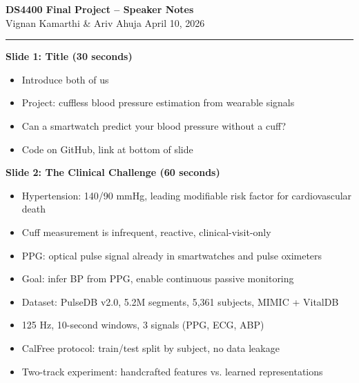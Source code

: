 \documentclass[11pt]{article}
\begin{document}
{\Large\bfseries DS4400 Final Project -- Speaker Notes}\\[2pt]
{\normalsize Vignan Kamarthi \& Ariv Ahuja \textbar{} April 10, 2026}
\vspace{4pt}
\hrule
\vspace{6pt}

\textbf{Slide 1: Title (30 seconds)}
\begin{itemize}
  \item [ARIV] Introduce both of us
  \item [ARIV] Project: cuffless blood pressure estimation from wearable signals
  \item [ARIV] Can a smartwatch predict your blood pressure without a cuff?
  \item [ARIV] Code on GitHub, link at bottom of slide
\end{itemize}

\textbf{Slide 2: The Clinical Challenge (60 seconds)}
\begin{itemize}
  \item [ARIV] Hypertension: 140/90 mmHg, leading modifiable risk factor for cardiovascular death
  \item [ARIV] Cuff measurement is infrequent, reactive, clinical-visit-only
  \item [ARIV] PPG: optical pulse signal already in smartwatches and pulse oximeters
  \item [ARIV] Goal: infer BP from PPG, enable continuous passive monitoring
  \item [ARIV] Dataset: PulseDB v2.0, 5.2M segments, 5,361 subjects, MIMIC + VitalDB
  \item [ARIV] 125 Hz, 10-second windows, 3 signals (PPG, ECG, ABP)
  \item [ARIV] CalFree protocol: train/test split by subject, no data leakage
  \item [ARIV] Two-track experiment: handcrafted features vs. learned representations
\end{itemize}
\end{document}
